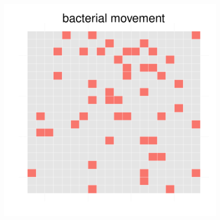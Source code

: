 \begin{figure}[h!]
{\begin{minipage}[t]{0.3\textwidth}
  \end{minipage}
  \begin{minipage}[t]{0.3\textwidth}
      \includegraphics[width=\textwidth]{../results/img/barkeri_20x20_seed9659_bac100.pdf}
  \end{minipage}
  }
\end{figure}
